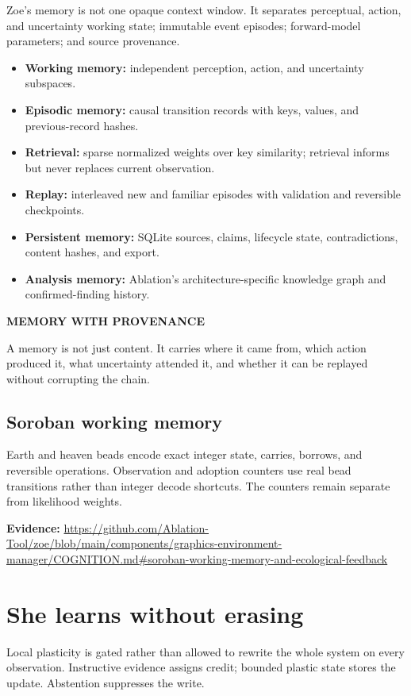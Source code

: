\documentclass[11pt]{article}
\newcommand{\card}[2]{\colorbox{ZoeLight}{\parbox{0.94\textwidth}{\small\textbf{\color{ZoeCyan!50!black}#1}\par\smallskip #2\par}}}
\newcommand{\evidence}[1]{\par\smallskip\small\color{ZoeGray}\textbf{Evidence:} #1\normalsize\par\smallskip}
\begin{document}
Zoe's memory is not one opaque context window. It separates perceptual, action, and uncertainty working state; immutable event episodes; forward-model parameters; and source provenance.

\begin{itemize}
  \item \textbf{Working memory:} independent perception, action, and uncertainty subspaces.
  \item \textbf{Episodic memory:} causal transition records with keys, values, and previous-record hashes.
  \item \textbf{Retrieval:} sparse normalized weights over key similarity; retrieval informs but never replaces current observation.
  \item \textbf{Replay:} interleaved new and familiar episodes with validation and reversible checkpoints.
  \item \textbf{Persistent memory:} SQLite sources, claims, lifecycle state, contradictions, content hashes, and export.
  \item \textbf{Analysis memory:} Ablation's architecture-specific knowledge graph and confirmed-finding history.
\end{itemize}

\card{MEMORY WITH PROVENANCE}{A memory is not just content. It carries where it came from, which action produced it, what uncertainty attended it, and whether it can be replayed without corrupting the chain.}

\subsection{Soroban working memory}

Earth and heaven beads encode exact integer state, carries, borrows, and reversible operations. Observation and adoption counters use real bead transitions rather than integer decode shortcuts. The counters remain separate from likelihood weights.

\evidence{\url{https://github.com/Ablation-Tool/zoe/blob/main/components/graphics-environment-manager/COGNITION.md\#soroban-working-memory-and-ecological-feedback}}

\clearpage
\section{She learns without erasing}

Local plasticity is gated rather than allowed to rewrite the whole system on every observation. Instructive evidence assigns credit; bounded plastic state stores the update. Abstention suppresses the write.
\end{document}
